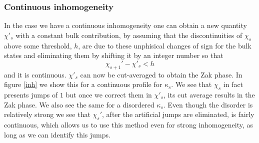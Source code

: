 \documentclass[twocolumn,amsmath,longbibliography,amssymb,superscriptaddress]{revtex4-1}
\begin{document}
\subsubsection{Continuous inhomogeneity}

In the case we have a continuous inhomogeneity one can obtain a new quantity $\chi'_s$ with a constant bulk contribution, by assuming that the discontinuities of $\chi_s$ above some threshold, $h$, are due to these unphisical changes of sign for the bulk states and eliminating them by shifting it by an integer number so that
\begin{equation}
\chi_{s+1}'-\chi'_s < h
\end{equation}
and it is continuous. $\chi'_s$ can now be cut-averaged to obtain the Zak phase. In figure \ref{inh} we show this for a continuous profile for $\kappa_s$. We see that $\chi_s$ in fact presents jumps of $1$ but once we correct them in $\chi'_s$, its cut average results in the Zak phase. We also see the same for a disordered $\kappa_s$. Even though the disorder is relatively strong we see that $\chi_s'$, after the artificial jumps are eliminated, is fairly continuous, which allows us to use this method even for strong inhomogeneity, as long as we can identify this jumps. 
\end{document}
